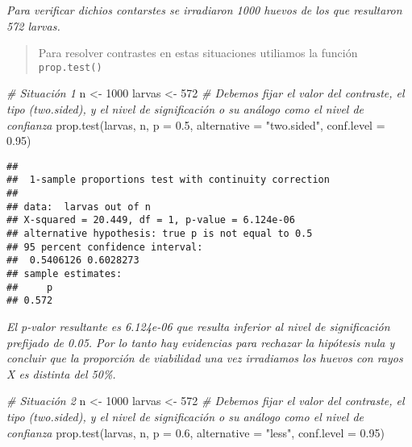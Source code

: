 \documentclass[
]{book}
\newenvironment{Shaded}{\begin{snugshade}}{\end{snugshade}}
\newcommand{\AttributeTok}[1]{\textcolor[rgb]{0.77,0.63,0.00}{#1}}
\newcommand{\CommentTok}[1]{\textcolor[rgb]{0.56,0.35,0.01}{\textit{#1}}}
\newcommand{\DecValTok}[1]{\textcolor[rgb]{0.00,0.00,0.81}{#1}}
\newcommand{\FloatTok}[1]{\textcolor[rgb]{0.00,0.00,0.81}{#1}}
\newcommand{\FunctionTok}[1]{\textcolor[rgb]{0.00,0.00,0.00}{#1}}
\newcommand{\NormalTok}[1]{#1}
\newcommand{\OtherTok}[1]{\textcolor[rgb]{0.56,0.35,0.01}{#1}}
\newcommand{\StringTok}[1]{\textcolor[rgb]{0.31,0.60,0.02}{#1}}
\begin{document}
\emph{Para verificar dichios contarstes se irradiaron 1000 huevos de los que resultaron 572 larvas.}

\begin{quote}
Para resolver contrastes en estas situaciones utiliamos la función \texttt{prop.test()}
\end{quote}

\begin{Shaded}
\begin{Highlighting}[]
\CommentTok{\# Situación 1}
\NormalTok{n }\OtherTok{\textless{}{-}} \DecValTok{1000}
\NormalTok{larvas }\OtherTok{\textless{}{-}} \DecValTok{572}
\CommentTok{\# Debemos fijar el valor del contraste, el tipo (two.sided), y el nivel de significación o su análogo como el nivel de confianza}
\FunctionTok{prop.test}\NormalTok{(larvas, n, }\AttributeTok{p =} \FloatTok{0.5}\NormalTok{, }\AttributeTok{alternative =} \StringTok{"two.sided"}\NormalTok{, }\AttributeTok{conf.level =} \FloatTok{0.95}\NormalTok{)}
\end{Highlighting}
\end{Shaded}

\begin{verbatim}
## 
##  1-sample proportions test with continuity correction
## 
## data:  larvas out of n
## X-squared = 20.449, df = 1, p-value = 6.124e-06
## alternative hypothesis: true p is not equal to 0.5
## 95 percent confidence interval:
##  0.5406126 0.6028273
## sample estimates:
##     p 
## 0.572
\end{verbatim}

\emph{El p-valor resultante es 6.124e-06 que resulta inferior al nivel de significación prefijado de 0.05. Por lo tanto hay evidencias para rechazar la hipótesis nula y concluir que la proporción de viabilidad una vez irradiamos los huevos con rayos X es distinta del 50\%.}

\begin{Shaded}
\begin{Highlighting}[]
\CommentTok{\# Situación 2}
\NormalTok{n }\OtherTok{\textless{}{-}} \DecValTok{1000}
\NormalTok{larvas }\OtherTok{\textless{}{-}} \DecValTok{572}
\CommentTok{\# Debemos fijar el valor del contraste, el tipo (two.sided), y el nivel de significación o su análogo como el nivel de confianza}
\FunctionTok{prop.test}\NormalTok{(larvas, n, }\AttributeTok{p =} \FloatTok{0.6}\NormalTok{, }\AttributeTok{alternative =} \StringTok{"less"}\NormalTok{, }\AttributeTok{conf.level =} \FloatTok{0.95}\NormalTok{)}
\end{Highlighting}
\end{Shaded}
\end{document}
